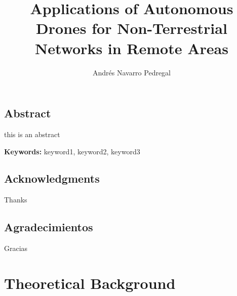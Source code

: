 \documentclass[oneside, 12pt, a4paper]{book}
\title{Applications of Autonomous Drones for Non-Terrestrial Networks in Remote Areas}
\author{Andrés Navarro Pedregal}
\begin{document}

\frontmatter
\maketitle

\blankpage%
\chapter*{Abstract}

this is an abstract

\textbf{Keywords:} keyword1, keyword2, keyword3

\blankpage%

\chapter*{Acknowledgments}
\begingroup
\let\clearpage\relax %

Thanks

\chapter*{Agradecimientos}

Gracias

\endgroup

\blankpage%

\renewcommand{\contentsname}{Table of Contents}
\tableofcontents

\blankpage%

\listoffigures

\blankpage%

\listoftables

\blankpage%

\printglossary[type=\acronymtype,style=long]

\blankpage%

\mainmatter%








\part{Theoretical Background}
\end{document}
